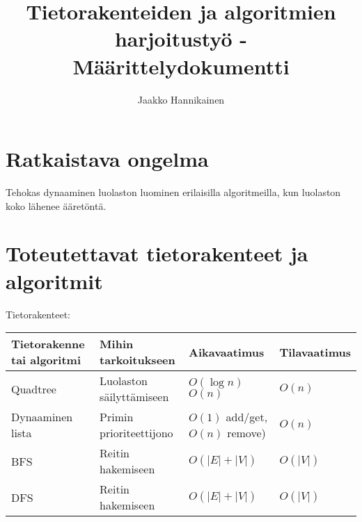 \documentclass{article}
\author{Jaakko Hannikainen}
\title{Tietorakenteiden ja algoritmien harjoitustyö - Määrittelydokumentti}
\begin{document}
\maketitle

\section{Ratkaistava ongelma}
Tehokas dynaaminen luolaston luominen erilaisilla algoritmeilla, kun luolaston
koko lähenee ääretöntä.

\section{Toteutettavat tietorakenteet ja algoritmit}
Tietorakenteet:

\begin{table}[h]
\begin{tabular}{| l | l | l | l |}
\hline
\rowcolor{Gray}
Tietorakenne tai algoritmi & Mihin tarkoitukseen      & Aikavaatimus                    & Tilavaatimus  \\ \hline
Quadtree                   & Luolaston säilyttämiseen & $O(\log n)$    $O(n)$           & $O(n)$        \\ \hline
Dynaaminen lista           & Primin prioriteettijono  & $O(1)$ add/get, $O(n)$ remove)  & $O(n)$        \\ \hline
BFS                        & Reitin hakemiseen        & $O(|E| + |V|)$                  & $O(|V|)$      \\ \hline
DFS                        & Reitin hakemiseen        & $O(|E| + |V|)$                  & $O(|V|)$      \\ \hline
\end{tabular}
\end{table}
\end{document}
